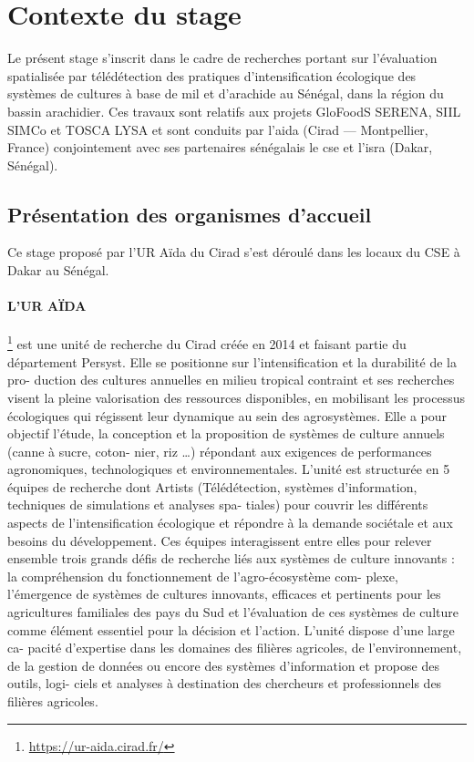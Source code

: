 \section{Contexte du stage}

Le présent stage s'inscrit dans le cadre de recherches portant sur l’évaluation spatialisée par télédétection des pratiques d’intensification écologique des systèmes de cultures à base de mil et d’arachide au Sénégal, dans la région du bassin arachidier. Ces travaux sont relatifs aux projets GloFoodS SERENA, SIIL SIMCo et TOSCA LYSA et sont conduits par 
l'\acrshort{aida} (Cirad --- Montpellier, France) conjointement avec ses partenaires sénégalais le \acrshort{cse} et l'\acrshort{isra} (Dakar, Sénégal).

  \subsection{Présentation des organismes d'accueil}
Ce stage proposé par l’UR Aïda du Cirad s’est déroulé dans les locaux du CSE à Dakar au Sénégal.
    
    \paragraph{L'UR AÏDA}\footnote{\url{https://ur-aida.cirad.fr/}} est une unité de recherche du Cirad créée en 2014 et faisant partie du
département Persyst. Elle se positionne sur l’intensification et la durabilité de la pro-
duction des cultures annuelles en milieu tropical contraint et ses recherches visent la
pleine valorisation des ressources disponibles, en mobilisant les processus écologiques
qui régissent leur dynamique au sein des agrosystèmes. Elle a pour objectif l’étude,
la conception et la proposition de systèmes de culture annuels (canne à sucre, coton-
nier, riz \ldots) répondant aux exigences de performances agronomiques, technologiques
et environnementales. L’unité est structurée en 5 équipes de recherche dont Artists
(Télédétection, systèmes d’information, techniques de simulations et analyses spa-
tiales) pour couvrir les différents aspects de l’intensification écologique et répondre
à la demande sociétale et aux besoins du développement. Ces équipes interagissent
entre elles pour relever ensemble trois grands défis de recherche liés aux systèmes de
culture innovants : la compréhension du fonctionnement de l’agro-écosystème com-
plexe, l’émergence de systèmes de cultures innovants, efficaces et pertinents pour les
agricultures familiales des pays du Sud et l’évaluation de ces systèmes de culture
comme élément essentiel pour la décision et l’action. L’unité dispose d’une large ca-
pacité d’expertise dans les domaines des filières agricoles, de l’environnement, de la
gestion de données ou encore des systèmes d’information et propose des outils, logi-
ciels et analyses à destination des chercheurs et professionnels des filières agricoles.
    
